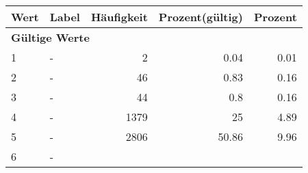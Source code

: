      \begin{longtable}{lXrrr}
     \toprule
     \textbf{Wert} & \textbf{Label} & \textbf{Häufigkeit} & \textbf{Prozent(gültig)} & \textbf{Prozent} \\
     \endhead
     \midrule
     \multicolumn{5}{l}{\textbf{Gültige Werte}}\\

     1 &
     \multicolumn{1}{X}{ -  } &


       \num{2} &
       \num[round-mode=places,round-precision=2]{0,04} &
         \num[round-mode=places,round-precision=2]{0,01} \\

     2 &
     \multicolumn{1}{X}{ -  } &


       \num{46} &
       \num[round-mode=places,round-precision=2]{0,83} &
         \num[round-mode=places,round-precision=2]{0,16} \\

     3 &
     \multicolumn{1}{X}{ -  } &


       \num{44} &
       \num[round-mode=places,round-precision=2]{0,8} &
         \num[round-mode=places,round-precision=2]{0,16} \\

     4 &
     \multicolumn{1}{X}{ -  } &


       \num{1379} &
       \num[round-mode=places,round-precision=2]{25} &
         \num[round-mode=places,round-precision=2]{4,89} \\

     5 &
     \multicolumn{1}{X}{ -  } &


       \num{2806} &
       \num[round-mode=places,round-precision=2]{50,86} &
         \num[round-mode=places,round-precision=2]{9,96} \\

     6 &
     \multicolumn{1}{X}{ -  } &



\end{longtable}
